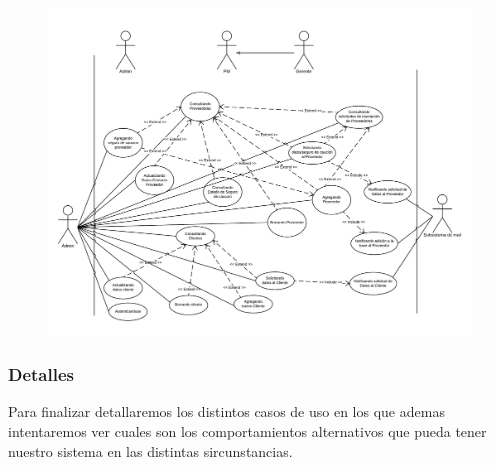 \begin{figure}[H]
\includegraphics[width=\linewidth]{diag/viejos/cu6.pdf}
\end{figure}

	\subsubsection{Detalles}
Para finalizar detallaremos los distintos casos de uso en los que ademas intentaremos ver cuales son los comportamientos alternativos que pueda tener nuestro sistema en las distintas sircunstancias.

